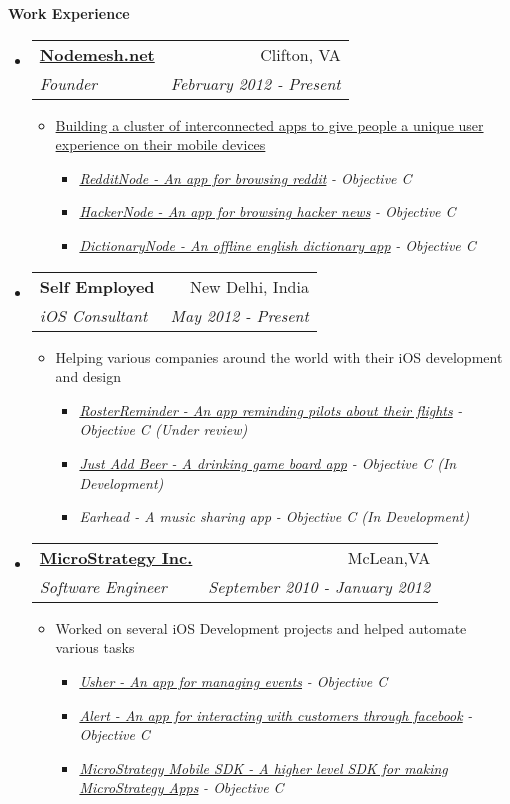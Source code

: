 \documentclass[letterpaper,11pt]{article}
\makeatletter
\newcommand{\resitem}[1]{\item #1 \vspace{-2pt}}
\newcommand{\resheading}[1]{{\large \colorbox{mygrey}{\begin{minipage}{\textwidth}{\textbf{#1 \vphantom{p\^{E}}}}\end{minipage}}}}
\newcommand{\ressubheading}[4]{
\begin{tabular*}{7.0in}{l@{\extracolsep{\fill}}r}
		\textbf{#1} & #2 \\
		\textit{#3} & \textit{#4} \\
\end{tabular*}\vspace{-6pt}}
\makeatother
\begin{document}
\resheading{Work Experience}
\begin{itemize}

\item
    \ressubheading{\href{http://www.nodemesh.net}{Nodemesh.net}}{Clifton, VA}{Founder}{February 2012 - Present}
    \begin{itemize}
        \resitem{\href{http://www.nodemesh.net}{Building a cluster of interconnected apps to give people a unique user experience on their mobile devices}}
        \begin{itemize}
           \resitem{\href{http://www.nodemesh.net/redditnode}{\emph{RedditNode - An app for browsing reddit}}\emph{ - Objective C}}
            \resitem{\href{http://www.nodemesh.net/hackernode}{\emph{HackerNode - An app for browsing hacker news}}\emph{ - Objective C}}
            \resitem{\href{http://www.nodemesh.net/dictionarynode}{\emph{DictionaryNode - An offline english dictionary app}}\emph{ - Objective C}}
        \end{itemize}
    \end{itemize}

\item
    \ressubheading{{Self Employed}}{New Delhi, India}{iOS Consultant}{May 2012 - Present}
    \begin{itemize}
        \resitem{Helping various companies around the world with their iOS development and design}
        \begin{itemize}
           \resitem{\href{http://apphqx.com}{\emph{RosterReminder - An app reminding pilots about their flights}}\emph{ - Objective C (Under review)}}
            \resitem{\href{http://drinktwo.com}{\emph{Just Add Beer - A drinking game board app}}\emph{ - Objective C (In Development)}}
            \resitem{\emph{Earhead - A music sharing app}\emph{ - Objective C (In Development)}}
        \end{itemize}
    \end{itemize}
  
\item
    \ressubheading{\href{http://www.microstrategy.com/Company}{MicroStrategy Inc.}}{McLean,VA}{Software Engineer}{September 2010 - January 2012}
    \begin{itemize}
        \resitem{Worked on several iOS Development projects and helped automate various tasks}
        \begin{itemize}
            \resitem{\href{http://itunes.apple.com/us/app/usher-by-microstrategy/id477543403}{\emph{Usher - An app for managing events}}\emph{ - Objective C}}
             \resitem{\href{http://itunes.apple.com/us/app/alert-for-iphone/id442981988?mt=8&ls=1}{\emph{Alert - An app for interacting with customers through facebook}}\emph{ - Objective C}}
               \resitem{ \href{http://www.microstrategy.com/mobile/}{\emph{MicroStrategy Mobile SDK - A higher level SDK for making MicroStrategy Apps}}\emph{ - Objective C}}
        \end{itemize}
    \end{itemize}


\end{itemize}
\end{document}
